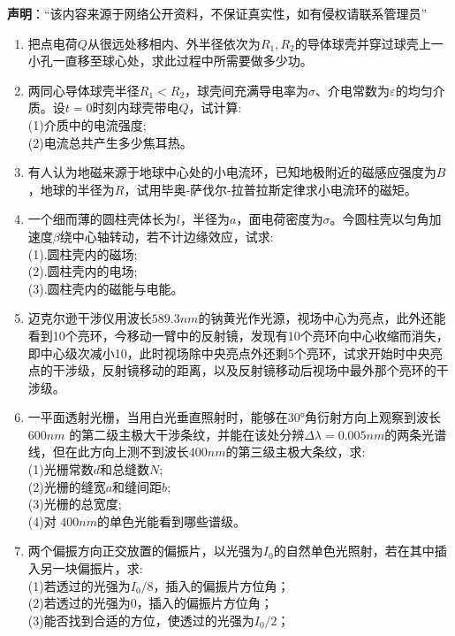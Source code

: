 
\textbf{声明}：“该内容来源于网络公开资料，不保证真实性，如有侵权请联系管理员”

\begin{enumerate}
\item 把点电荷$Q$从很远处移相内、外半径依次为$R_1,R_2$的导体球壳并穿过球壳上一小孔一直移至球心处，求此过程中所需要做多少功。
\item 两同心导体球壳半径$R_1<R_2$，球壳间充满导电率为$\sigma$、介电常数为$\varepsilon$的均匀介质。设$t=0$时刻内球壳带电$Q$，试计算:\\
(1)介质中的电流强度;\\
(2)电流总共产生多少焦耳热。
\item 有人认为地磁来源于地球中心处的小电流环，已知地极附近的磁感应强度为$B$，地球的半径为$R$，试用毕奥-萨伐尔-拉普拉斯定律求小电流环的磁矩。
\item 一个细而薄的圆柱壳体长为$l$，半径为$a$，面电荷密度为$\sigma$。今圆柱壳以匀角加速度$\beta$绕中心轴转动，若不计边缘效应，试求:\\
(1).圆柱壳内的磁场;\\
(2).圆柱壳内的电场;\\
(3).圆柱壳内的磁能与电能。
\item 迈克尔逊干涉仪用波长$589.3nm$的钠黄光作光源，视场中心为亮点，此外还能看到10个亮环，今移动一臂中的反射镜，发现有10个亮环向中心收缩而消失，即中心级次减小10，此时视场除中央亮点外还剩5个亮环，试求开始时中央亮点的干涉级，反射镜移动的距离，以及反射镜移动后视场中最外那个亮环的干涉级。
\item 一平面透射光栅，当用白光垂直照射时，能够在$30$°角衍射方向上观察到波长 $600nm$ 的第二级主极大干涉条纹，并能在该处分辨$\Delta \lambda=0.005nm$的两条光谱线，但在此方向上测不到波长$400nm$的第三级主极大条纹，求:\\
(1)光栅常数$d$和总缝数$N$;\\
(2)光栅的缝宽$a$和缝间距$b$;\\
(3)光栅的总宽度;\\
(4)对 $400nm $的单色光能看到哪些谱级。
\item 两个偏振方向正交放置的偏振片，以光强为$I_0$的自然单色光照射，若在其中插入另一块偏振片，求:\\
(1)若透过的光强为$I_0/8$，插入的偏振片方位角；\\
(2)若透过的光强为$0$，插入的偏振片方位角；\\
(3)能否找到合适的方位，使透过的光强为$I_0/2$；\\

\end{enumerate}
